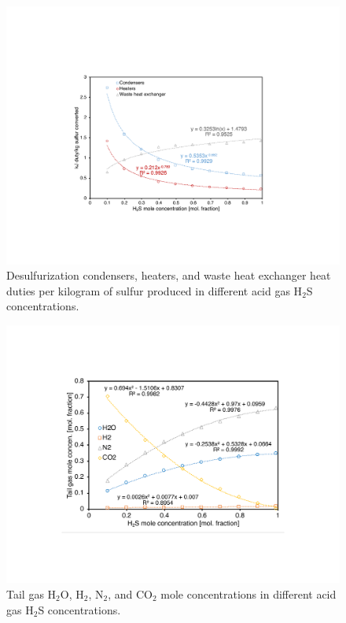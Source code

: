 \documentclass[11pt]{report}
\begin{document}
\begin{figure}
\includegraphics[width=0.8\columnwidth]{images/Claus_duty1.pdf}
\caption{Desulfurization condensers, heaters, and waste heat exchanger heat duties per kilogram of sulfur produced in different acid gas H$_2$S concentrations.}
\label{fig:Claus_duty1}
\end{figure}

\begin{figure}
\includegraphics[width=0.8\columnwidth]{images/Claus_concent1.pdf}
\caption{Tail gas H$_2$O, H$_2$, N$_2$, and CO$_2$ mole concentrations in different acid gas H$_2$S concentrations.}
\label{fig:Claus_concent1}
\end{figure}
\end{document}
